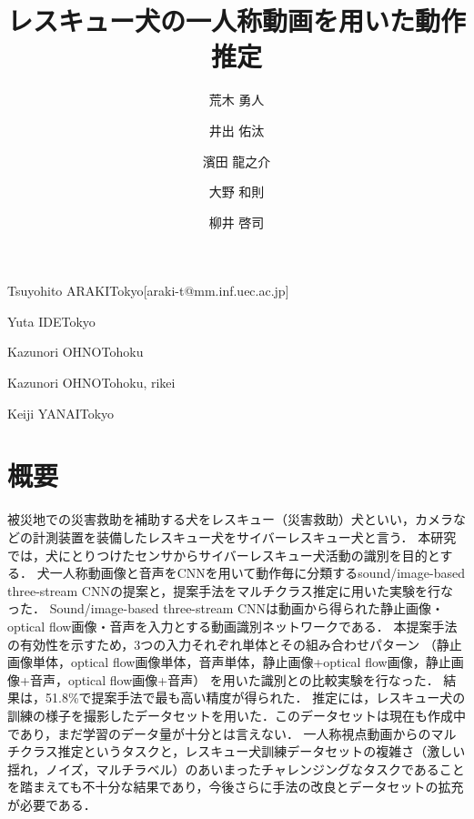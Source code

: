 \documentclass[MIRU,submit]{miru2019j}
\begin{document}
\title{レスキュー犬の一人称動画を用いた動作推定}


 \author{荒木 勇人}{Tsuyohito ARAKI}{Tokyo}[araki-t@mm.inf.uec.ac.jp]
 \author{井出 佑汰}{Yuta IDE}{Tokyo}%
 \author{濱田 龍之介}{Kazunori OHNO}{Tohoku}%
 \author{大野 和則}{Kazunori OHNO}{Tohoku, rikei}%
 \author{柳井 啓司}{Keiji YANAI}{Tokyo}%


\maketitle
\section*{概要}
被災地での災害救助を補助する犬をレスキュー（災害救助）犬といい，カメラなどの計測装置を装備したレスキュー犬をサイバーレスキュー犬と言う．
本研究では，犬にとりつけたセンサからサイバーレスキュー犬活動の識別を目的とする．
犬一人称動画像と音声をCNNを用いて動作毎に分類するsound/image-based three-stream CNNの提案と，提案手法をマルチクラス推定に用いた実験を行なった．
Sound/image-based three-stream CNNは動画から得られた静止画像・optical flow画像・音声を入力とする動画識別ネットワークである．
本提案手法の有効性を示すため，3つの入力それぞれ単体とその組み合わせパターン
（静止画像単体，optical flow画像単体，音声単体，静止画像+optical flow画像，静止画像+音声，optical flow画像+音声）
を用いた識別との比較実験を行なった．
結果は，51.8\%で提案手法で最も高い精度が得られた．
推定には，レスキュー犬の訓練の様子を撮影したデータセットを用いた．このデータセットは現在も作成中であり，まだ学習のデータ量が十分とは言えない．
一人称視点動画からのマルチクラス推定というタスクと，レスキュー犬訓練データセットの複雑さ（激しい揺れ，ノイズ，マルチラベル）のあいまったチャレンジングなタスクであることを踏まえても不十分な結果であり，今後さらに手法の改良とデータセットの拡充が必要である．
\end{document}
